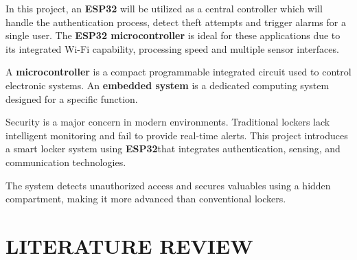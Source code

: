 \documentclass[conference]{IEEEtran}
\begin{document}
In this project, an \textbf{ESP32} will be utilized as a central controller which will handle the authentication process, detect theft attempts and trigger alarms for a single user. The \textbf{ESP32 microcontroller} is ideal for these applications due to its integrated Wi-Fi capability, processing speed and multiple sensor interfaces.

A \textbf{microcontroller} is a compact programmable integrated circuit used to control electronic systems.  
An \textbf{embedded system} is a dedicated computing system designed for a specific function.

Security is a major concern in modern environments. Traditional lockers lack intelligent monitoring and fail to provide real-time alerts. This project introduces a smart locker system using \textbf{ESP32}that integrates authentication, sensing, and communication technologies.

The system detects unauthorized access and secures valuables using a hidden compartment, making it more advanced than conventional lockers.

\section{LITERATURE REVIEW}
\end{document}
